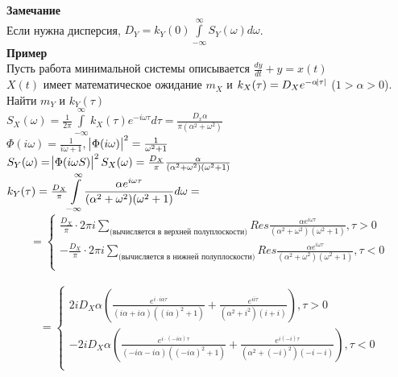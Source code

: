 \documentclass[russian, 12pt, fleqn]{article}
\begin{document}
\textbf{Замечание\ } \\
Если нужна дисперсия, $D_Y = k_Y(0) \displaystyle{\int \limits _ { - \infty} ^ {\infty}} S_Y (\omega) d \omega$.\\ 
\textbf{Пример}\\
Пусть работа  минимальной системы описывается $\frac{dy}{dt} + y = x(t)$\\
$X(t)$ имеет математическое ожидание $m_X$ и $k_X(\tau) = D_X e^{-\alpha \abs{\tau}}$ ($1 > \alpha > 0$). Найти $m_Y$ и $k_Y(\tau)$\\
$S_X(\omega)  = \frac{1}{2\pi} \displaystyle{\int \limits_{-\infty}^{\infty}} k_X (\tau)  e^{-i\omega \tau} d \tau = \frac{D_x \alpha}{\pi(\alpha^2 + \omega ^ 2)}$\\
$\Phi(i\omega) = \frac{1}{i\omega + 1}$, $\abs{\Phi(i\omega)}^2 = \frac{1}{\omega^2 + 1}$\\
$S_Y(\omega)  = \abs{\Phi(i\omega S)}^2S_X(\omega) = \frac{D_X}{\pi} \frac{\alpha}{(\alpha^2 + \omega^2)(\omega^2 + 1)}$\\
$k_Y(\tau) = \frac{D_X}{\pi} \displaystyle{ \int \limits _{-\infty}^{\infty} } \frac{\alpha e^{i \omega \tau} }{(\alpha^2 + \omega^2)(\omega^2 + 1)}d\omega =\\$
\begin{equation*} 
= 
 \begin{cases}
\frac{D_X}{\pi}\cdot 2 \pi i \displaystyle{\sum \limits _{  \textrm{(вычисляется в верхней полуплоскости)} } ^ { }} Res  \frac{\alpha e^{i \omega \tau}}{(\alpha^2 + \omega^2)(\omega^2  + 1)}, \tau > 0\\
-\frac{D_X}{\pi}\cdot 2 \pi i \displaystyle{\sum \limits _{ \textrm{(вычисляется в нижней полуплоскости)}} ^ { }} Res \frac{\alpha e^{i \omega \tau}}{(\alpha^2 + \omega^2)(\omega^2  + 1)}, \tau < 0\\
 \end{cases}
\end{equation*}
\\
\begin{equation*}
= 
 \begin{cases}
2iD_X\alpha (\frac{e^{i \cdot i \alpha \tau}}{(i\alpha + i \alpha)((i\alpha )^2 + 1)} + \frac{e^{ii\tau}}{(\alpha^2 + i^2)(i + i)}), \tau > 0\\
-2iD_X\alpha (\frac{e^{i \cdot(- i \alpha) \tau}}{(-i\alpha - i \alpha)((-i\alpha )^2 + 1)} + \frac{e^{i(-i)\tau}}{(\alpha^2 + (-i)^2)(-i - i)}), \tau < 0\\
 \end{cases}
\end{equation*}
\end{document}
